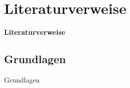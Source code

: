 \section{Literaturverweise}
\begin{frame}[c]
	\begin{center}
		\LARGE \textbf{Literaturverweise}
	\end{center}
\end{frame}
\subsection{Grundlagen}
\begin{frame}[c]
	\begin{center}
		\large Grundlagen
	\end{center}
\end{frame}

